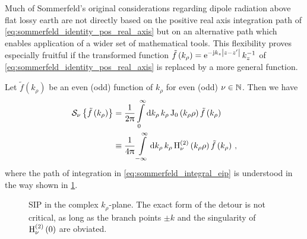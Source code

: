 Much of Sommerfeld's original considerations
\cite{Sommerfeld1909,Sommerfeld1926} regarding dipole radiation above flat
lossy earth are not directly based on the positive real axis integration path
of \eqref{eq:sommerfeld_identity_pos_real_axis} but on an alternative path
which enables application of a wider set of mathematical tools.
This flexibility proves especially fruitful if the transformed function
$\tilde{f} \left(k_\rho\right) = \mathrm{e}^{-\mathrm{j} k_z \left\vert z - z^\prime\right\vert}\, k_z^{-1}$ of
\eqref{eq:sommerfeld_identity_pos_real_axis} is replaced by a more general
function.
\begin{corollary}
	Let $\tilde{f} \left(k_\rho\right)$ be an even (odd) function of $k_\rho$
	for even (odd) $\nu \in \mathbb{N}$.
	Then we have
	\begin{align}
		\mathcal{S}_{\nu} \left\{\tilde{f} \left( k_\rho \right) \right\}
		&=
		\frac{1}{2\uppi}
		\int\limits_{0}^{\infty} \mathrm{d} k_\rho \, k_\rho
		\operatorname{J}_{0} \left(k_\rho \rho\right)
		\tilde{f} \left(k_\rho\right) 
		\label{eq:sommerfeld_integral_sip}
		\\
		&\equiv
		\frac{1}{4\uppi}
		\int\limits_{-\infty}^{\infty} \mathrm{d} k_\rho \, k_\rho
		\operatorname{H}_{\nu}^{\left( 2 \right)} \left(k_\rho \rho\right)
		\tilde{f} \left(k_\rho\right)
		\label{eq:sommerfeld_integral_eip}
		\, ,
	\end{align}
	where the path of integration in \eqref{eq:sommerfeld_integral_eip} is
	understood in the way shown in \cref{fig:sip}.
\end{corollary}
	
\begin{figure}
	\centering
	\caption[\acl{SIP} in the complex $k_\rho$-plane]
	{\acf{SIP} in the complex $k_\rho$-plane. The exact form of the detour
	is not critical, as long as the branch points $\pm k$ and the singularity
	of $\operatorname{H}_{\nu}^{\left( 2 \right)} \left(0\right)$ are obviated.}
	\label{fig:sip}
\end{figure}

